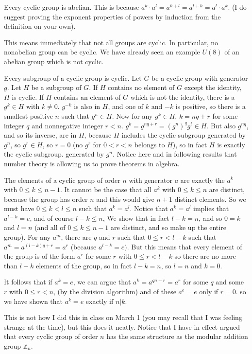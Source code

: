 \documentclass[12pt]{article}
\begin{document}
Every cyclic group is abelian.  This is because $a^k \cdot a^l = a^{k+l} = a^{l+k} = a^l \cdot a^k$.  (I do suggest proving the exponent properties of powers by induction from the definition on your own).

This means immediately that not all groups are cyclic.  In particular, no nonabelian group can be cyclic.  We have already seen an example $U(8)$ of an abelian group which is not cyclic.

Every subgroup of a cyclic group is cyclic.  Let $G$ be a cyclic group with generator $g$.  Let $H$ be a subgroup of $G$.  If $H$ contains no element of $G$ except the identity, $H$ is cyclic.  If $H$ contains an element of $G$ which is not the identity, there is a $g^k \in H$ with $k \neq 0$.  $g^{-k}$ is also in $H$, and one of $k$ and $-k$ is positive, so there is a smallest positive $n$ such that $g^n \in H$.  Now for any $g^k \in H$, $k = nq+r$ for some integer $q$ and nonnegative integer $r<n$.  $g^k = g^{nq+r} = (g^n)^qg^t \in H$.  But also $g^{nq}$, and so its inverse, are in $H$, because $H$ includes the cyclic subgroup generated by $g^n$, so $g^r \in H$, so $r=0$ (no $g^r$ for $0<r<n$ belongs to $H$), so in fact $H$ is exactly the cyclic subgroup.  generated by $g^n$.   Notice here and in following results that number theory is allowing us to prove theorems in algebra.

The elements of a cyclic group of order $n$ with generator $a$ are exactly the $a^k$ with $0 \leq k \leq n-1$.  It cannot be the case that
all $a^k$ with $0 \leq k \leq n$ are distinct, because the group has order $n$ and this would give $n+1$ distinct elements.  So we must have
$0 \leq k < l \leq n$ such that $a^k = a^l$.  Notice that $a^k = a^l$ implies that $a^{l-k} = e$, and of course $l-k \leq n$,  We show that in fact $l-k = n$, and so $0 = k$ and $l=n$ (and all of  $0 \leq k \leq n-1$ are distinct, and so make up the entire group).  For any $a^m$, there are $q$ and $r$ such that $0 \leq r <l-k$ such that $a^m = a^{(l-k)q +r} = a^r$ (because $a^{l-k}=e)$.  But this means that every element of the group is of the form
$a^r$ for some $r$ with $0 \leq r <l-k$ so there are no more than $l-k$ elements of the group, so in fact $l-k=n$, so $l=n$ and $k=0$.

It follows that if $a^k = e$, we can argue that $a^k = a^{qn+r} = a^r$ for some $q$ and some $r$ with $0 \leq r <n$, (by the division algorithm) and of these $a^e=e$ only if $r=0$. so we have shown that $a^k = e$ exactly if $n|k$.

This is not how I did this in class on March 1 (you may recall that I was feeling strange at the time), but this does it neatly.  Notice that I have in effect argued that every cyclic group of order $n$ has the same structure as the modular addition group ${\mathbb Z}_n$.
\end{document}
